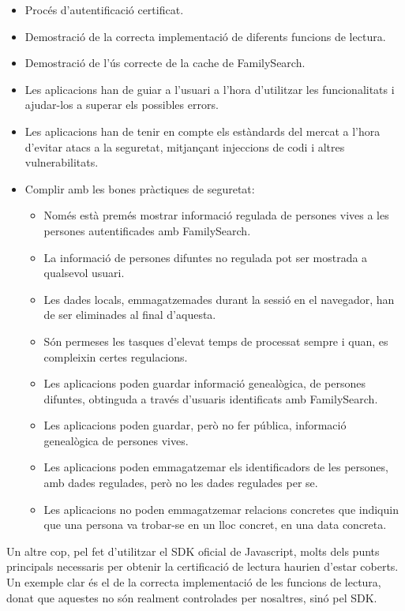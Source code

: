     \begin{itemize}
        \item Procés d'autentificació certificat.
        \item Demostració de la correcta implementació de diferents funcions de lectura.
        \item Demostració de l'ús correcte de la cache de FamilySearch.
        \item Les aplicacions han de guiar a l'usuari a l'hora d'utilitzar les funcionalitats i ajudar-los a superar els possibles errors.
        \item Les aplicacions han de tenir en compte els estàndards del mercat a l'hora d'evitar atacs a la seguretat, mitjançant injeccions de codi i altres vulnerabilitats.
        \item Complir amb les bones pràctiques de seguretat:
        \begin{itemize}
            \item Només està premés mostrar informació regulada de persones vives a les persones autentificades amb FamilySearch.
            \item La informació de persones difuntes no regulada pot ser mostrada a qualsevol usuari.
            \item Les dades locals, emmagatzemades durant la sessió en el navegador, han de ser eliminades al final d'aquesta.
            \item Són permeses les tasques d'elevat temps de processat sempre i quan, es compleixin certes regulacions.
            \item Les aplicacions poden guardar informació genealògica, de persones difuntes, obtinguda a través d'usuaris identificats amb FamilySearch.
            \item Les aplicacions poden guardar, però no fer pública, informació genealògica de persones vives.
            \item Les aplicacions poden emmagatzemar els identificadors de les persones, amb dades regulades, però no les dades regulades per se.
            \item Les aplicacions no poden emmagatzemar relacions concretes que indiquin que una persona va trobar-se en un lloc concret, en una data concreta.
        \end{itemize}
    \end{itemize}

    Un altre cop, pel fet d'utilitzar el SDK oficial de Javascript, molts dels punts principals necessaris per obtenir la certificació de lectura haurien d'estar coberts. Un exemple clar és el de la correcta implementació de les funcions de lectura, donat que aquestes no són realment controlades per nosaltres, sinó pel SDK.

